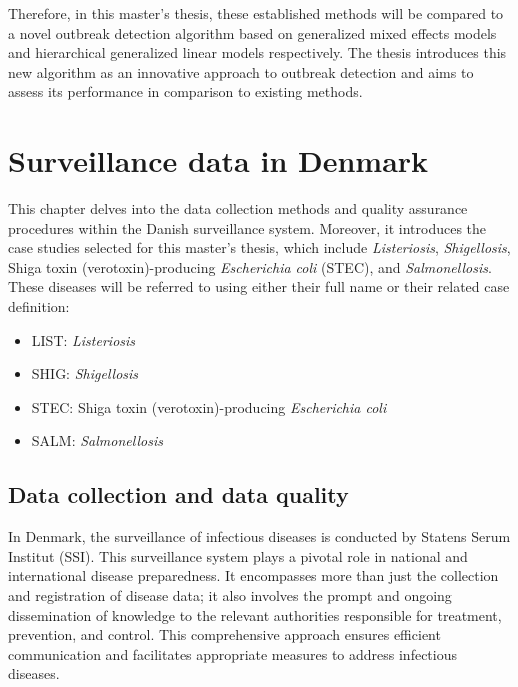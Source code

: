 \documentclass[a4paper,twoside,11pt]{report} %
\theoremstyle{definition}
\theoremstyle{definition}
\theoremstyle{definition}
\theoremstyle{definition}
\theoremstyle{remark}
\begin{document}
Therefore, in this master's thesis, these established methods will be compared to a novel outbreak detection algorithm based on generalized mixed effects models and hierarchical generalized linear models respectively. The thesis introduces this new algorithm as an innovative approach to outbreak detection and aims to assess its performance in comparison to existing methods.

\cleardoublepage

\chapter{Surveillance data in Denmark}\label{Dataset}

This chapter delves into the data collection methods and quality assurance procedures within the Danish surveillance system. Moreover, it introduces the case studies selected for this master's thesis, which include \textit{Listeriosis}, \textit{Shigellosis}, Shiga toxin (verotoxin)-producing \textit{Escherichia coli} (STEC), and \textit{Salmonellosis}. These diseases will be referred to using either their full name or their related case definition:

\begin{itemize}
  \item LIST: \textit{Listeriosis}
  \item SHIG: \textit{Shigellosis}
  \item STEC: Shiga toxin (verotoxin)-producing \textit{Escherichia coli}
  \item SALM: \textit{Salmonellosis}
\end{itemize}

\section{Data collection and data quality}

In Denmark, the surveillance of infectious diseases is conducted by Statens Serum Institut (SSI). This surveillance system plays a pivotal role in national and international disease preparedness. It encompasses more than just the collection and registration of disease data; it also involves the prompt and ongoing dissemination of knowledge to the relevant authorities responsible for treatment, prevention, and control. This comprehensive approach ensures efficient communication and facilitates appropriate measures to address infectious diseases.
\end{document}
